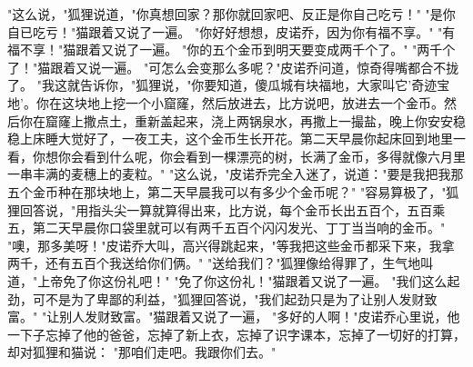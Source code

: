 \documentclass[12pt,UTF8]{ctexbook}
\begin{document}
"这么说，"狐狸说道，"你真想回家？那你就回家吧、反正是你自己吃亏！"
"是你自已吃亏！"猫跟着又说了一遍。
"你好好想想，皮诺乔，因为你有福不享。"
"有福不享！"猫跟着又说了一遍。
"你的五个金币到明天要变成两千个了。"
"两千个了！"猫跟着又说一遍。
"可怎么会变那么多呢？"皮诺乔问道，惊奇得嘴都合不拢了。
"我这就告诉你，"狐狸说，"你要知道，傻瓜城有块福地，大家叫它'奇迹宝地'。你在这块地上挖一个小窟窿，然后放进去，比方说吧，放进去一个金币。然后你在窟窿上撒点土，重新盖起来，浇上两锅泉水，再撒上一撮盐，晚上你安安稳稳上床睡大觉好了，一夜工夫，这个金币生长开花。第二天早晨你起床回到地里一看，你想你会看到什么呢，你会看到一棵漂亮的树，长满了金币，多得就像六月里一串丰满的麦穗上的麦粒。"
"这么说，"皮诺乔完全入迷了，说道："要是我把我那五个金币种在那块地上，第二天早晨我可以有多少个金币呢？"
"容易算极了，"狐狸回答说，"用指头尖一算就算得出来，比方说，每个金币长出五百个，五百乘五，第二天早晨你口袋里就可以有两千五百个闪闪发光、丁丁当当响的金币。"
"噢，那多美呀！"皮诺乔大叫，高兴得跳起来，"等我把这些金币都采下来，我拿两千，还有五百个我送给你们俩。"
"送给我们？"狐狸像给得罪了，生气地叫道，"上帝免了你这份礼吧！"
"免了你这份礼！"猫跟着又说了一遍。
"我们这么起劲，可不是为了卑鄙的利益，"狐狸回答说，"我们起劲只是为了让别人发财致富。"
"让别人发财致富。"猫跟着又说了一遍，
"多好的人啊！"皮诺乔心里说，他一下子忘掉了他的爸爸，忘掉了新上衣，忘掉了识字课本，忘掉了一切好的打算，却对狐狸和猫说：
"那咱们走吧。我跟你们去。"

\chapter{}
\end{document}
